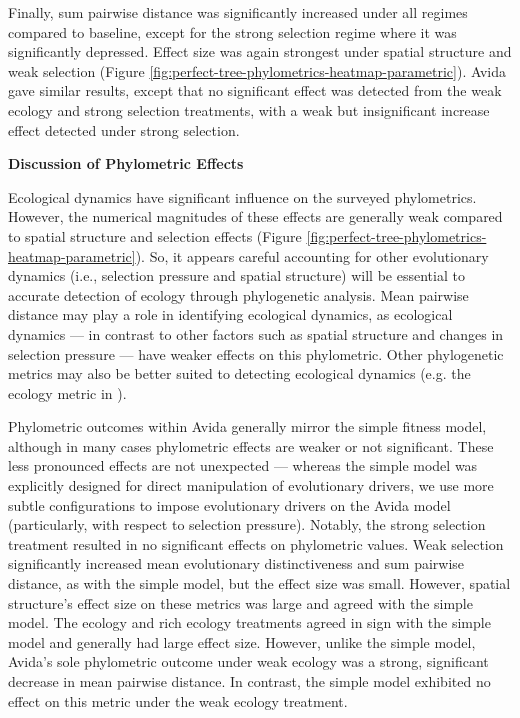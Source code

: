 Finally, sum pairwise distance was significantly increased under all regimes compared to baseline, except for the strong selection regime where it was significantly depressed.
Effect size was again strongest under spatial structure and weak selection (Figure \ref{fig:perfect-tree-phylometrics-heatmap-parametric}).
Avida gave similar results, except that no significant effect was detected from the weak ecology and strong selection treatments, with a weak but insignificant increase effect detected under strong selection.

\textbf{Discussion of Phylometric Effects}

Ecological dynamics have significant influence on the surveyed phylometrics.
However, the numerical magnitudes of these effects are generally weak compared to spatial structure and selection effects (Figure \ref{fig:perfect-tree-phylometrics-heatmap-parametric}).
So, it appears careful accounting for other evolutionary dynamics (i.e., selection pressure and spatial structure) will be essential to accurate detection of ecology through phylogenetic analysis.
Mean pairwise distance may play a role in identifying ecological dynamics, as ecological dynamics --- in contrast to other factors such as spatial structure and changes in selection pressure --- have weaker effects on this phylometric.
Other phylogenetic metrics may also be better suited to detecting ecological dynamics (e.g. the ecology metric in \citep{dolson2019modes}).

Phylometric outcomes within Avida generally mirror the simple fitness model, although in many cases phylometric effects are weaker or not significant.
These less pronounced effects are not unexpected --- whereas the simple model was explicitly designed for direct manipulation of evolutionary drivers, we use more subtle configurations to impose evolutionary drivers on the Avida model (particularly, with respect to selection pressure).
Notably, the strong selection treatment resulted in no significant effects on phylometric values.
Weak selection significantly increased mean evolutionary distinctiveness and sum pairwise distance, as with the simple model, but the effect size was small.
However, spatial structure's effect size on these metrics was large and agreed with the simple model.
The ecology and rich ecology treatments agreed in sign with the simple model and generally had large effect size.
However, unlike the simple model, Avida's sole phylometric outcome under weak ecology was a strong, significant decrease in mean pairwise distance.
In contrast, the simple model exhibited no effect on this metric under the weak ecology treatment.

